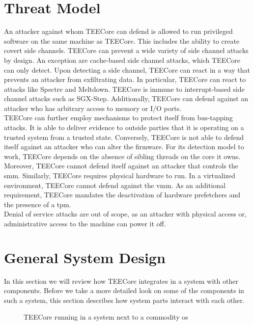 \section{Threat Model}
\label{sec:30:tee_attacker_model}
An attacker against whom TEECore can defend is allowed to run privileged
software on the same machine as TEECore. This includes the ability to create
covert side channels. TEECore can prevent a wide variety of side channel attacks
by design. An exception are cache-based side channel attacks, which TEECore can
only detect. Upon detecting a side channel, TEECore can react in a way that
prevents an attacker from exfiltrating data. In particular, TEECore can react to
attacks like Spectre and Meltdown. TEECore is immune to interrupt-based side
channel attacks such as SGX-Step. Additionally, TEECore can defend against an
attacker who has arbitrary access to memory or I/O ports. \\

TEECore can further employ mechanisms to protect itself from bus-tapping
attacks. It is able to deliver evidence to outside parties that it is operating
on a trusted system from a trusted state. Conversely, TEECore is not able to
defend itself against an attacker who can alter the firmware. For its detection
model to work, TEECore depends on the absence of sibling threads on the core it
owns. Moreover, TEECore cannot defend itself against an attacker that controls
the \gls{smm}. Similarly, TEECore requires physical hardware to run. In a
virtualized environment, TEECore cannot defend against the \gls{vmm}. As an
additional requirement, TEECore mandates the deactivation of hardware
prefetchers and the presence of a \gls{tpm}.\\

Denial of service attacks are out of scope, as an attacker with physical access
or, administrative access to the machine can power it off.

\section{General System Design}
\label{sec:30:tee_general}
In this section we will review how TEECore integrates in a system with other
components. Before we take a more detailed look on some of the components in
such a system, this section describes how system parts interact with each other.

\label{sec:30:system_overview}
\begin{figure}
  \begin{center}
    
    \caption{TEECore running in a system next to a commodity \gls{os}}
    \label{fig:30:tee_system_design}
  \end{center}
\end{figure}

